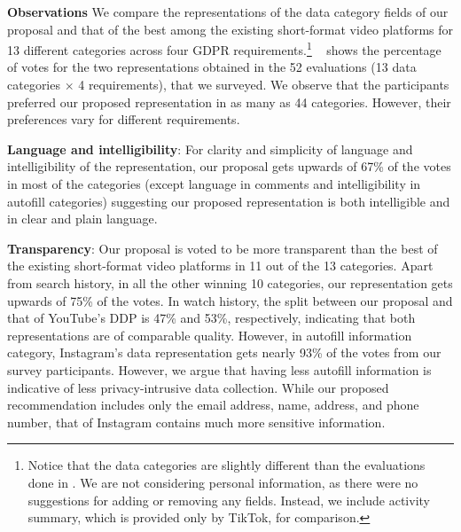 \noindent
\textbf{Observations}
We compare the representations of the data category fields of our proposal and that of the best among the existing short-format video platforms for 13 different categories across four GDPR requirements.\footnote{Notice that the data categories are slightly different than the evaluations done in . We are not considering personal information, as there were no suggestions for adding or removing any fields. Instead, we include activity summary, which is provided only by TikTok, for comparison.}
~ shows the percentage of votes for the two representations obtained in the 52 evaluations (13 data categories $\times$ 4 requirements), that we surveyed.
We observe that the participants preferred our proposed representation in as many as 44 categories.
However, their preferences vary for different requirements.


\noindent
\textbf{Language and intelligibility}: For clarity and simplicity of language and intelligibility of the representation, our proposal gets upwards of 67\% of the votes in most of the categories (except language in comments and intelligibility in autofill categories) suggesting our proposed representation is both intelligible and in clear and plain language.

\noindent
\textbf{Transparency}: Our proposal is voted to be more transparent than the best of the existing short-format video platforms in 11 out of the 13 categories. 
Apart from search history, in all the other winning 10 categories, our representation gets upwards of 75\% of the votes.
In watch history, the split between our proposal and that of YouTube's DDP is 47\% and 53\%, respectively, indicating that both representations are of comparable quality.
However, in autofill information category, Instagram's data representation gets nearly 93\% of the votes from our survey participants. However, we argue that having less autofill information is indicative of less privacy-intrusive data collection.
While our proposed recommendation includes only the email address, name, address, and phone number, that of Instagram contains much more sensitive information.

